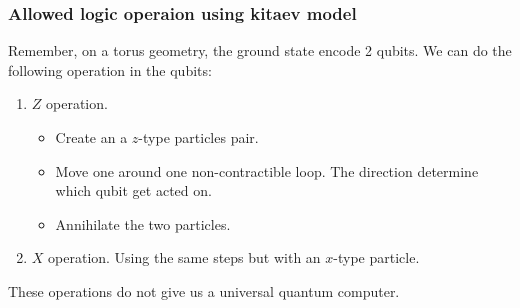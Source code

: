 \documentclass{beamer}
\renewcommand{\(}{\left(}
\renewcommand{\)}{\right)}
\renewcommand{\[}{\left[}
\renewcommand{\]}{\right]}
\begin{document}
\begin{frame}
    \frametitle{Allowed logic operaion using kitaev model}
    Remember, on a torus geometry, the ground state encode 2 qubits. We can do the following operation in the qubits:
    \begin{enumerate}
        \item $Z$ operation. 
        \begin{itemize}
            \item Create an a $z$-type particles pair. 
            \item Move one around one non-contractible loop. The direction determine which qubit get acted on. 
            \item Annihilate the two particles. 
        \end{itemize}
        \item $X$ operation. Using the same steps but with an $x$-type particle. 
    \end{enumerate}
    These operations do not give us a universal quantum computer. 
\end{frame}
\end{document}
